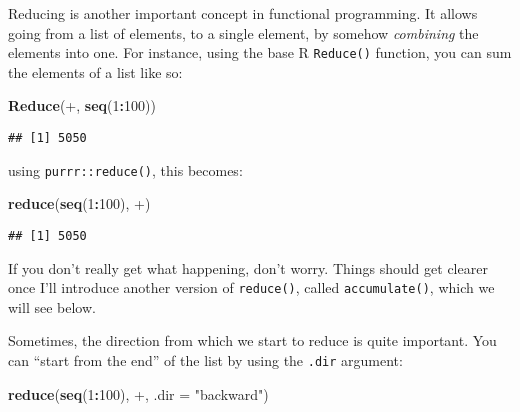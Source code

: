 \documentclass[
]{article}
\newenvironment{Shaded}{\begin{snugshade}}{\end{snugshade}}
\newcommand{\DataTypeTok}[1]{\textcolor[rgb]{0.13,0.29,0.53}{#1}}
\newcommand{\DecValTok}[1]{\textcolor[rgb]{0.00,0.00,0.81}{#1}}
\newcommand{\KeywordTok}[1]{\textcolor[rgb]{0.13,0.29,0.53}{\textbf{#1}}}
\newcommand{\NormalTok}[1]{#1}
\newcommand{\OperatorTok}[1]{\textcolor[rgb]{0.81,0.36,0.00}{\textbf{#1}}}
\newcommand{\StringTok}[1]{\textcolor[rgb]{0.31,0.60,0.02}{#1}}
\begin{document}
Reducing is another important concept in functional programming. It allows going from a list of
elements, to a single element, by somehow \emph{combining} the elements into one. For instance, using
the base R \texttt{Reduce()} function, you can sum the elements of a list like so:

\begin{Shaded}
\begin{Highlighting}[]
\KeywordTok{Reduce}\NormalTok{(}\StringTok{\textasciigrave{}}\DataTypeTok{+}\StringTok{\textasciigrave{}}\NormalTok{, }\KeywordTok{seq}\NormalTok{(}\DecValTok{1}\OperatorTok{:}\DecValTok{100}\NormalTok{))}
\end{Highlighting}
\end{Shaded}

\begin{verbatim}
## [1] 5050
\end{verbatim}

using \texttt{purrr::reduce()}, this becomes:

\begin{Shaded}
\begin{Highlighting}[]
\KeywordTok{reduce}\NormalTok{(}\KeywordTok{seq}\NormalTok{(}\DecValTok{1}\OperatorTok{:}\DecValTok{100}\NormalTok{), }\StringTok{\textasciigrave{}}\DataTypeTok{+}\StringTok{\textasciigrave{}}\NormalTok{)}
\end{Highlighting}
\end{Shaded}

\begin{verbatim}
## [1] 5050
\end{verbatim}

If you don't really get what happening, don't worry. Things should get clearer once I'll introduce
another version of \texttt{reduce()}, called \texttt{accumulate()}, which we will see below.

Sometimes, the direction from which we start to reduce is quite important. You can ``start from the
end'' of the list by using the \texttt{.dir} argument:

\begin{Shaded}
\begin{Highlighting}[]
\KeywordTok{reduce}\NormalTok{(}\KeywordTok{seq}\NormalTok{(}\DecValTok{1}\OperatorTok{:}\DecValTok{100}\NormalTok{), }\StringTok{\textasciigrave{}}\DataTypeTok{+}\StringTok{\textasciigrave{}}\NormalTok{, }\DataTypeTok{.dir =} \StringTok{"backward"}\NormalTok{)}
\end{Highlighting}
\end{Shaded}
\end{document}
